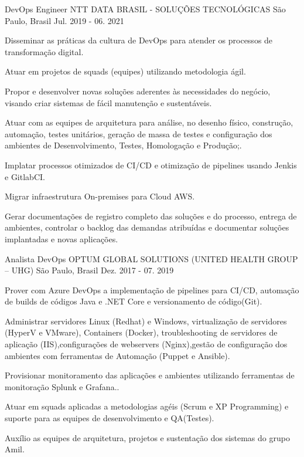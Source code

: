 \begin{cventries}
  \cventry
    {DevOps Engineer} %
    {NTT DATA BRASIL - SOLUÇÕES TECNOLÓGICAS} %
    {São Paulo, Brasil} %
    {Jul. 2019 - 06. 2021} %
    {
      \begin{cvitems} %
        \item {Disseminar as práticas da cultura de DevOps para atender os processos de transformação digital.}
        \item {Atuar em projetos de squads (equipes) utilizando metodologia ágil.}
        \item {Propor e desenvolver novas soluções aderentes às necessidades do negócio, visando criar sistemas de fácil manutenção e sustentáveis.}
        \item {Atuar com as equipes de arquitetura para análise, no desenho físico, construção, automação, testes unitários, geração de massa de testes e configuração dos ambientes de Desenvolvimento, Testes, Homologação e Produção;.}
        \item {Implatar processos otimizados de CI/CD e otimização de pipelines usando Jenkis e GitlabCI.}
        \item {Migrar infraestrutura On-premises para Cloud AWS.}
        \item {Gerar documentações de registro completo das soluções e do processo, entrega de ambientes, controlar o backlog das demandas atribuídas e documentar soluções implantadas e novas aplicações.}
      \end{cvitems}
    }


  \cventry
    {Analista DevOps} %
    {OPTUM GLOBAL SOLUTIONS (UNITED HEALTH GROUP – UHG)} %
    {São Paulo, Brasil} %
    {Dez. 2017 - 07. 2019} %
    {
      \begin{cvitems} %
        \item {Prover com  Azure DevOps a implementação de pipelines para CI/CD, automação de builds de códigos Java e .NET Core e versionamento de código(Git).}
        \item {Administrar servidores Linux (Redhat) e Windows, virtualização de servidores (HyperV e VMware), Containers (Docker), troubleshooting de servidores de aplicação (IIS),configurações de webservers (Nginx),gestão de configuração dos ambientes com ferramentas de Automação (Puppet e Ansible).}
        \item {Provisionar monitoramento das aplicações e ambientes utilizando ferramentas de monitoração Splunk e Grafana..}
        \item {Atuar em squads aplicadas a metodologias agéis (Scrum e XP Programming) e suporte para as equipes de desenvolvimento e QA(Testes).}
        \item {Auxílio as equipes de arquitetura, projetos e sustentação dos sistemas do grupo Amil.}
      \end{cvitems}
    }


\end{cventries}